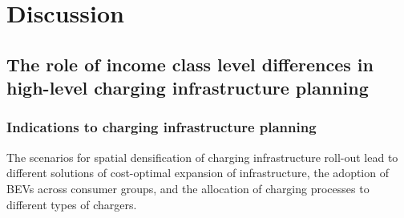 \documentclass[preprint,review,11pt, authoryear]{elsarticle}
\begin{document}
    

\section{Discussion}
   
    \subsection{The role of income class level differences in high-level charging infrastructure planning}
    \subsubsection{Indications to charging infrastructure planning}
    The scenarios for spatial densification of charging infrastructure roll-out lead to different solutions of cost-optimal expansion of infrastructure, the adoption of BEVs across consumer groups, and the allocation of charging processes to different types of chargers.
\end{document}
